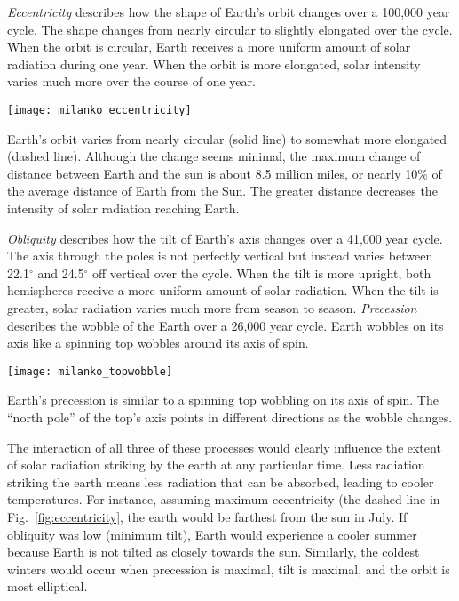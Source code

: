 \documentclass{tufte-handout}
\begin{document}
\textit{Eccentricity} describes how the shape of Earth's orbit changes over a 100,000 year cycle. The shape changes from nearly circular to slightly elongated over the cycle. When the orbit is circular, Earth receives a more uniform amount of solar radiation during one year.  When the orbit is more elongated, solar intensity varies much more over the course of one year.  
\begin{marginfigure}%
	\begin{center}
		\texttt{[image: milanko\_eccentricity]}
	\end{center}
	\caption{Earth's orbit varies from nearly circular (solid line) to somewhat more elongated (dashed line). Although the change seems minimal, the maximum change of distance between Earth and the sun is about 8.5 million miles, or nearly 10\% of the average distance of Earth from the Sun. The greater distance decreases the intensity of solar radiation reaching Earth.}
	\label{fig:eccentricity}
\end{marginfigure} 
\textit{Obliquity} describes how the tilt of Earth's axis changes over a 41,000 year cycle. The axis through the poles is not perfectly vertical but instead varies between 22.1$^{\circ}$ and 24.5$^{\circ}$ off vertical over the cycle. When the tilt is more upright, both hemispheres receive a more uniform amount of solar radiation. When the tilt is greater, solar radiation varies much more from season to season. \textit{Precession} describes the wobble of the Earth over a 26,000 year cycle. Earth wobbles on its axis like a spinning top wobbles around its axis of spin. 
\begin{marginfigure}%
	\texttt{[image: milanko\_topwobble]}
	\caption{Earth's precession is similar to a spinning top wobbling on its axis of spin. The “north pole” of the top's axis points in different directions as the wobble changes.}
	\label{fig:topwobble}
\end{marginfigure}
The interaction of all three of these processes would clearly influence the extent of solar radiation striking by the earth at any particular time.  Less radiation striking the earth means less radiation that can be absorbed, leading to cooler temperatures. For instance, assuming maximum eccentricity (the dashed line in Fig.~\ref{fig:eccentricity}, the earth would be farthest from the sun in July.  If obliquity was low (minimum tilt), Earth would experience a cooler summer because Earth is not tilted as closely towards the sun.  Similarly, the coldest winters would occur when precession is maximal, tilt is maximal, and the orbit is most elliptical.
\end{document}

